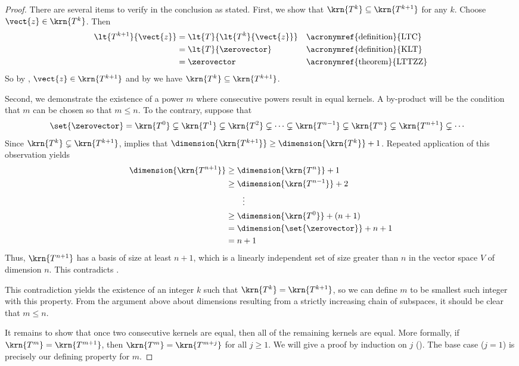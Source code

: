%
\begin{proof}
There are several items to verify in the conclusion as stated.  First, we show that $\krn{T^k}\subseteq\krn{T^{k+1}}$ for any $k$.    Choose $\vect{z}\in\krn{T^k}$.  Then
%
\begin{align*}
\lt{T^{k+1}}{\vect{z}}
&=\lt{T}{\lt{T^k}{\vect{z}}}&&\text{\acronymref{definition}{LTC}}\\
&=\lt{T}{\zerovector}&&\text{\acronymref{definition}{KLT}}\\
&=\zerovector&&\text{\acronymref{theorem}{LTTZZ}}
\end{align*}
%
So by , $\vect{z}\in\krn{T^{k+1}}$ and by  we have $\krn{T^k}\subseteq\krn{T^{k+1}}$.\par
%
Second, we demonstrate the existence of a power $m$ where consecutive powers result in equal kernels.  A by-product will be the condition that $m$ can be chosen so that $m\leq n$.  To the contrary, suppose that 
%
\begin{align*}
\set{\zerovector}
&=\krn{T^0}
\subsetneq\krn{T^1}
\subsetneq\krn{T^2}
\subsetneq\cdots
\subsetneq\krn{T^{n-1}}
\subsetneq\krn{T^n}
\subsetneq\krn{T^{n+1}}
\subsetneq\cdots
\end{align*}
%
Since $\krn{T^k}\subsetneq\krn{T^{k+1}}$,  implies that $\dimension{\krn{T^{k+1}}}\geq\dimension{\krn{T^k}}+1$.  Repeated application of this observation yields
%
\begin{align*}
\dimension{\krn{T^{n+1}}}
&\geq\dimension{\krn{T^n}}+1\\
&\geq\dimension{\krn{T^{n-1}}}+2\\
&\quad\quad\vdots\\
&\geq\dimension{\krn{T^{0}}}+(n+1)\\
&=\dimension{\set{\zerovector}}+n+1\\
&=n+1
\end{align*}
%
Thus, $\krn{T^{n+1}}$ has a basis of size at least $n+1$, which is a linearly independent set of size greater than $n$ in the vector space $V$ of dimension $n$.  This contradicts .\par
%
This contradiction yields the existence of an integer $k$ such that $\krn{T^k}=\krn{T^{k+1}}$, so we can define $m$ to be smallest such integer with this property.  From the argument above about dimensions resulting from a strictly increasing chain of subspaces, it should be clear that $m\leq n$.\par
%
It remains to show that once two consecutive kernels are equal, then all of the remaining kernels are equal.  More formally, if $\krn{T^m}=\krn{T^{m+1}}$, then $\krn{T^m}=\krn{T^{m+j}}$ for all $j\geq 1$.  We will give a proof by induction on $j$ ().  The base case ($j=1$) is precisely our defining property for $m$.\par

\end{proof}
